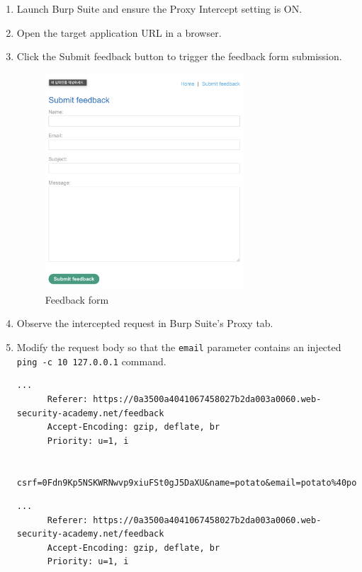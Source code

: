 \documentclass{article}
\begin{document}
\begin{description}
    \begin{enumerate}
      \item Launch Burp Suite and ensure the Proxy Intercept setting is ON.
      \item Open the target application URL in a browser.
      \item Click the Submit feedback button to trigger the feedback form submission.
      \begin{figure}[htbp]
      \centering
      \includegraphics[width=0.7\textwidth]{../figure/figure3.png}
      \caption{Feedback form}
      \label{fig:feedback-form}
      \end{figure}
      \item Observe the intercepted request in Burp Suite's Proxy tab.
      \item Modify the request body so that the \texttt{email} parameter contains an injected \texttt{ping -c 10 127.0.0.1} command.
      \begin{lstlisting}[label={lst:blind-original-request},caption={Original request}]
      ...
      Referer: https://0a3500a4041067458027b2da003a0060.web-security-academy.net/feedback
      Accept-Encoding: gzip, deflate, br
      Priority: u=1, i

      csrf=0Fdn9Kp5NSKWRNwvp9xiuFSt0gJ5DaXU&name=potato&email=potato%40potato.com&subject=potato&message=potato
      \end{lstlisting}

      \begin{lstlisting}[label={lst:modified-request},caption={Modified request}]
      ...
      Referer: https://0a3500a4041067458027b2da003a0060.web-security-academy.net/feedback
      Accept-Encoding: gzip, deflate, br
      Priority: u=1, i


\end{lstlisting}
\end{enumerate}
\end{description}
\end{document}
